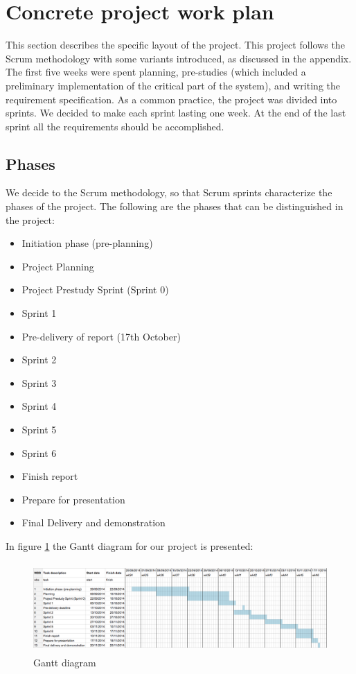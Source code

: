 \documentclass[11pt,a4paper,titlepage,oneside]{report}
\begin{document}
\section{Concrete project work plan}
This section describes the specific layout of the project. This project follows the Scrum methodology with some variants introduced, as discussed in the appendix. The first five weeks were spent planning, pre-studies (which included a preliminary implementation of the critical part of the system), and writing the requirement specification. As a common practice, the project was divided into sprints. We decided to make each sprint lasting one week. At the end of the last sprint all the requirements should be accomplished.
\subsection{Phases}
We decide to the Scrum methodology, so that Scrum sprints characterize the phases of the project.
The following are the phases that can be distinguished in the project:
\begin{itemize}
\item Initiation phase (pre-planning)
\item Project Planning
\item Project Prestudy Sprint (Sprint 0)

\item Sprint 1
\item Pre-delivery of report (17th October)

\item Sprint 2
\item Sprint 3
\item Sprint 4
\item Sprint 5
\item Sprint 6

\item Finish report
\item Prepare for presentation
\item Final Delivery and demonstration
\end{itemize}

In figure \ref{fig:gantt} the Gantt diagram for our project is presented:
\begin{figure}[h]
\begin{center}
\includegraphics[height=130px,width=440px]{img/gantt.png}
\caption{Gantt diagram}
\label{fig:gantt}
\medskip
\small
\end{center}
\end{figure}
\end{document}
